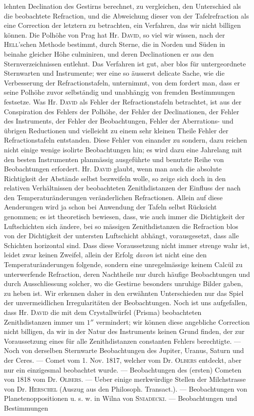 \noindent lehnten Declination des Gestirns berechnet, zu vergleichen, den Unterschied als die beobachtete Refraction, und die Abweichung dieser von der Tafelrefraction als eine Correction der letztern zu betrachten, ein Verfahren, das wir nicht billigen können. Die Polhöhe von Prag hat Hr. \textsc{David}, so viel wir wissen, nach der \textsc{Hell}'schen Methode bestimmt, durch Sterne, die in Norden und Süden in beinahe gleicher Höhe culminiren, und deren Declinationen er aus den Sternverzeichnissen entlehnt. Das Verfahren ist gut, aber blos für untergeordnete Sternwarten und Instrumente; wer eine so äusserst delicate Sache, wie die Verbesserung der Refractionstafeln, unternimmt, von dem fordert man, dass er seine Polhöhe zuvor selbständig und unabhängig von fremden Bestimmungen festsetze. Was Hr. \textsc{David} als Fehler der Refractionstafeln betrachtet, ist aus der Conspiration des Fehlers der Polhöhe, der Fehler der Declinationen, der Fehler des Instruments, der Fehler der Beobachtungen, Fehler der Aberrations- und übrigen Reductionen und vielleicht zu einem sehr kleinen Theile Fehler der Refractionstafeln entstanden. Diese Fehler von einander zu sondern, dazu reichen nicht einige wenige isolirte Beobachtungen hin; es wird dazu eine Jahrelang mit den besten Instrumenten planmässig ausgeführte und benutzte Reihe von Beobachtungen erfordert. Hr. \textsc{David} glaubt, wenn man auch die absolute Richtigkeit der Abstände selbst bezweifeln wolle, so zeige sich doch in den relativen Verhältnissen der beobachteten Zenithdistanzen der Einfluss der nach den Temperaturänderungen veränderlichen Refractionen. Allein auf diese Aenderungen wird ja schon bei Anwendung der Tafeln selbst Rücksicht genommen; es ist theoretisch bewiesen, dass, wie auch immer die Dichtigkeit der Luftschichten sich ändere, bei so mässigen Zenithdistanzen die Refraction blos von der Dichtigkeit der untersten Luftschicht abhängt, vorausgesetzt, dass alle Schichten horizontal sind. Dass diese Voraussetzung nicht immer strenge wahr ist, leidet zwar keinen Zweifel, allein der Erfolg \emph{davon} ist nicht eine den Temperaturänderungen folgende, sondern eine unregelmässige keinem Calcül zu unterwerfende Refraction, deren Nachtheile nur durch häufige Beobachtungen und durch Ausschliessung solcher, wo die Gestirne besonders unruhige Bilder gaben, zu heben ist. Wir erkennen daher in den erwähnten Unterschieden nur das Spiel der unvermeidlichen Irregularitäten der Beobachtungen. Noch ist uns aufgefallen, dass Hr. \textsc{David} die mit dem Crystallwürfel (Prisma) beobachteten Zenithdistanzen immer um $1''$ vermindert; wir können diese angebliche Correction nicht billigen, da wir in der Natur des Instruments keinen Grund finden, der zur Voraussetzung eines für alle Zenithdistanzen constanten Fehlers berechtigte. --- Noch von derselben Sternwarte Beobachtungen des Jupiter, Uranus, Saturn und der Ceres. --- Comet vom 1. Nov. 1817, welcher vom Dr. \textsc{Olbers} entdeckt, aber nur ein einzigesmal beobachtet wurde. --- Beobachtungen des (ersten) Cometen von 1818 vom Dr. \textsc{Olbers}. --- Ueber einige merkwürdige Stellen der Milchstrasse von Dr. \textsc{Herschel} (Auszug aus den Philosoph. Transact.). --- Beobachtungen von Planetenoppositionen u. s. w. in Wilna von \textsc{Sniadecki}. --- Beobachtungen und Bestimmungen 